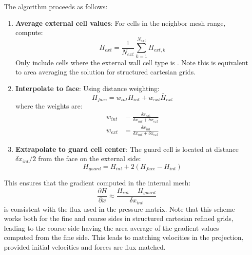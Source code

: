 The algorithm proceeds as follows:

\begin{enumerate}
    \item \textbf{Average external cell values}: For cells in the neighbor mesh range, compute:
    \begin{equation}
        \bar{H}_{ext} = \frac{1}{N_{ext}} \sum_{k=1}^{N_{ext}} H_{ext,k}
        \label{eq:h_ext_mean}
    \end{equation}
    Only include cells where the external wall cell type is . Note this is equivalent to area averaging the solution for structured cartesian grids.

    \item \textbf{Interpolate to face}: Using distance weighting:
    \begin{equation}
        H_{face} = w_{int} H_{int} + w_{ext} \bar{H}_{ext}
        \label{eq:h_face}
    \end{equation}
    where the weights are:
    \begin{align}
        w_{int} &= \frac{\delta x_{ext}}{\delta x_{int} + \delta x_{ext}} \\
        w_{ext} &= \frac{\delta x_{int}}{\delta x_{int} + \delta x_{ext}}
        \label{eq:weights}
    \end{align}

    \item \textbf{Extrapolate to guard cell center}: The guard cell is located at distance $\delta x_{int}/2$ from the face on the external side:
    \begin{equation}
        H_{guard} = H_{int} + 2(H_{face} - H_{int})
        \label{eq:h_guard}
    \end{equation}
\end{enumerate}

This ensures that the gradient computed in the internal mesh:
\begin{equation}
    \frac{\partial H}{\partial x} \approx \frac{H_{int} - H_{guard}}{\delta x_{int}}
    \label{eq:gradient_internal}
\end{equation}
is consistent with the flux used in the pressure matrix. Note that this scheme works both for the fine and coarse sides in structured cartesian refined grids, leading to the coarse side having the area average of the gradient values computed from the fine side. This leads to matching velocities in the projection, provided initial velocities and forces are flux matched.
